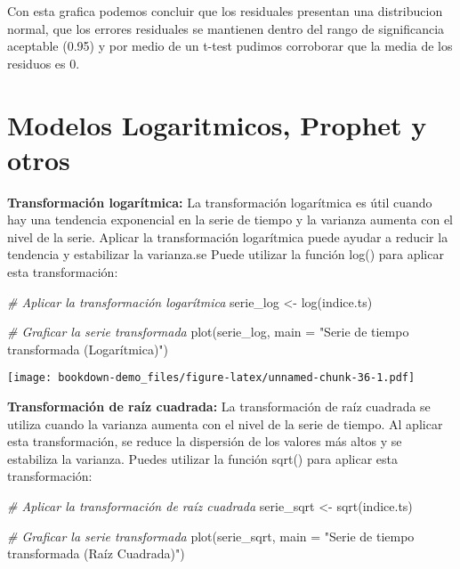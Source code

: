 \documentclass[
]{book}
\newenvironment{Shaded}{\begin{snugshade}}{\end{snugshade}}
\newcommand{\AttributeTok}[1]{\textcolor[rgb]{0.77,0.63,0.00}{#1}}
\newcommand{\CommentTok}[1]{\textcolor[rgb]{0.56,0.35,0.01}{\textit{#1}}}
\newcommand{\FunctionTok}[1]{\textcolor[rgb]{0.00,0.00,0.00}{#1}}
\newcommand{\NormalTok}[1]{#1}
\newcommand{\OtherTok}[1]{\textcolor[rgb]{0.56,0.35,0.01}{#1}}
\newcommand{\StringTok}[1]{\textcolor[rgb]{0.31,0.60,0.02}{#1}}
\begin{document}
Con esta grafica podemos concluir que los residuales presentan una distribucion normal, que los errores residuales se mantienen dentro del rango de significancia aceptable (0.95) y por medio de un t-test pudimos corroborar que la media de los residuos es 0.

\hypertarget{modelos-logaritmicos-prophet-y-otros}{%
\chapter{Modelos Logaritmicos, Prophet y otros}\label{modelos-logaritmicos-prophet-y-otros}}

\textbf{Transformación logarítmica:}
La transformación logarítmica es útil cuando hay una tendencia exponencial en la serie de tiempo y la varianza aumenta con el nivel de la serie. Aplicar la transformación logarítmica puede ayudar a reducir la tendencia y estabilizar la varianza.se Puede utilizar la función log() para aplicar esta transformación:

\begin{Shaded}
\begin{Highlighting}[]
\CommentTok{\# Aplicar la transformación logarítmica}
\NormalTok{serie\_log }\OtherTok{\textless{}{-}} \FunctionTok{log}\NormalTok{(indice.ts)}

\CommentTok{\# Graficar la serie transformada}
\FunctionTok{plot}\NormalTok{(serie\_log, }\AttributeTok{main =} \StringTok{"Serie de tiempo transformada (Logarítmica)"}\NormalTok{)}
\end{Highlighting}
\end{Shaded}

\texttt{[image: bookdown-demo\_files/figure-latex/unnamed-chunk-36-1.pdf]}

\textbf{Transformación de raíz cuadrada:}
La transformación de raíz cuadrada se utiliza cuando la varianza aumenta con el nivel de la serie de tiempo. Al aplicar esta transformación, se reduce la dispersión de los valores más altos y se estabiliza la varianza. Puedes utilizar la función sqrt() para aplicar esta transformación:

\begin{Shaded}
\begin{Highlighting}[]
\CommentTok{\# Aplicar la transformación de raíz cuadrada}
\NormalTok{serie\_sqrt }\OtherTok{\textless{}{-}} \FunctionTok{sqrt}\NormalTok{(indice.ts)}

\CommentTok{\# Graficar la serie transformada}
\FunctionTok{plot}\NormalTok{(serie\_sqrt, }\AttributeTok{main =} \StringTok{"Serie de tiempo transformada (Raíz Cuadrada)"}\NormalTok{)}
\end{Highlighting}
\end{Shaded}
\end{document}
